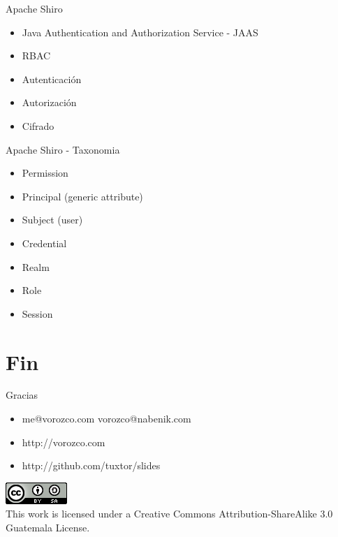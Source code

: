 \documentclass{beamer}
\begin{document}
\begin{frame}{Apache Shiro}
\begin{itemize}
	\item Java Authentication and Authorization Service - JAAS
	\item RBAC
	\item Autenticación
	\item Autorización
	\item Cifrado
\end{itemize}
\end{frame}
\begin{frame}{Apache Shiro - Taxonomia}
\begin{itemize}
	\item Permission
	\item Principal (generic attribute)
	\item Subject (user)
	\item Credential
	\item Realm
	\item Role
	\item Session
\end{itemize}
\end{frame}

\section{Fin}

\begin{frame}{Gracias}
\begin{itemize}
	\item me@vorozco.com vorozco@nabenik.com
	\item http://vorozco.com
	\item http://github.com/tuxtor/slides
\end{itemize}
\begin{center}
	\includegraphics[width=0.1\linewidth]{Images/cclogo}
	\\
	This work is licensed under a Creative Commons Attribution-ShareAlike 3.0 Guatemala License.
\end{center}
\end{frame}
\end{document}
